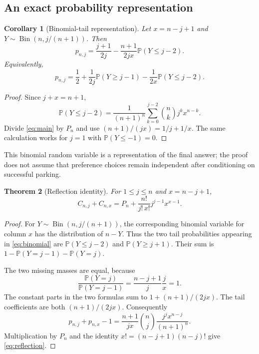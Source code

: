 \documentclass[11pt,letterpaper]{article}
\numberwithin{equation}{section}
\newtheorem{theorem}{Theorem}[section]
\newtheorem{corollary}[theorem]{Corollary}
\theoremstyle{definition}
\newcommand{\PP}{\mathbb P}
\DeclareMathOperator{\Bin}{Bin}
\begin{document}
\subsection{An exact probability representation}
\begin{corollary}[Binomial-tail representation]\label{cor:binomial}
Let $x=n-j+1$ and $Y\sim\Bin(n,j/(n+1))$. Then
\begin{equation}\label{eq:binomial}
 p_{n,j}=\frac{j+1}{2j}
       -\frac{n+1}{2jx}\PP(Y\le j-2).
\end{equation}
Equivalently,
\begin{equation}\label{eq:split-probability}
 p_{n,j}=\frac12+\frac1{2j}\PP(Y\ge j-1)
                    -\frac1{2x}\PP(Y\le j-2).
\end{equation}
\end{corollary}
\begin{proof}
Since $j+x=n+1$,
\[
 \PP(Y\le j-2)=\frac1{(n+1)^n}
             \sum_{k=0}^{j-2}\binom nk j^k x^{n-k}.
\]
Divide \eqref{eq:main} by $P_n$ and use
$(n+1)/(jx)=1/j+1/x$. The same calculation works for $j=1$ with
$\PP(Y\le-1)=0$.
\end{proof}

This binomial random variable is a representation of the final answer;
the proof does not assume that preference choices remain independent after
conditioning on successful parking.

\begin{theorem}[Reflection identity]\label{thm:reflection}
For $1\le j\le n$ and $x=n-j+1$,
\begin{equation}\label{eq:reflection}
 \boxed{\displaystyle
 C_{n,j}+C_{n,x}
   =P_n+\frac{n!}{j!\,x!}j^{j-1}x^{x-1}.}
\end{equation}
\end{theorem}
\begin{proof}
For $Y\sim\Bin(n,j/(n+1))$, the corresponding binomial variable for
column $x$ has the distribution of $n-Y$. Thus the two tail probabilities
appearing in \eqref{eq:binomial} are
$\PP(Y\le j-2)$ and $\PP(Y\ge j+1)$. Their sum is
$1-\PP(Y=j-1)-\PP(Y=j)$.

The two missing masses are equal, because
\[
 \frac{\PP(Y=j)}{\PP(Y=j-1)}
   =\frac{n-j+1}{j}\frac{j}{x}=1.
\]
The constant parts in the two formulas sum to
$1+(n+1)/(2jx)$. The tail coefficients are both $(n+1)/(2jx)$.
Consequently
\[
 p_{n,j}+p_{n,x}-1
  =\frac{n+1}{jx}\binom nj\frac{j^j x^{n-j}}{(n+1)^n}.
\]
Multiplication by $P_n$ and the identity $x!=(n-j+1)(n-j)!$ give
\eqref{eq:reflection}.
\end{proof}
\end{document}
